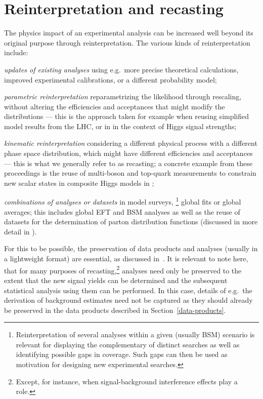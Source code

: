 \documentclass[11pt]{article}
\begin{document}
\section{Reinterpretation and recasting}
\label{reinterpret}

The physics impact of an experimental analysis can be increased well beyond its original purpose through \gls{reinterpretation}.
The various kinds of \gls{reinterpretation} include:
\begin{description}
	\item{\it updates of existing analyses} using e.g.\ more precise theoretical calculations, improved experimental calibrations, or a different probability model;
	\item{\it parametric reinterpretation} reparametrizing the likelihood through rescaling, without altering the efficiencies and acceptances that might modify the distributions --- this is the approach taken for example when reusing simplified model results from the LHC, or in in the context of Higgs signal strengths; 
    \item{\it kinematic reinterpretation} considering a different physical process with a different phase space distribution, which might have different efficiencies and acceptances --- this is what we generally refer to as \gls{recasting}; a concrete example from these proceedings is the reuse of multi-boson and top-quark measurements to constrain new scalar states in composite Higgs models in \cite{Banerjee:2022xmu}; 
    \item{\it combinations of analyses or datasets} in model surveys,%
    \footnote{Reinterpretation of several analyses within a given (usually \gls{BSM}) scenario is relevant for displaying the complementary of distinct searches as well as identifying possible gaps in coverage. Such gaps can then be used as motivation for designing new experimental searches.} 
    global fits or global averages; this includes global \gls{EFT} and \gls{BSM} analyses as well as the reuse of datasets for the determination of parton distribution functions (discussed in more detail in \cite{Cranmer:2021urp}).
\end{description}

For this to be possible, the preservation of \glspl{data product} and analyses (usually in a lightweight format) are essential, as discussed in~.
It is relevant to note here, that for many purposes of \gls{recasting},\footnote{Except, for instance, when signal-background interference effects play a role.} analyses need only be preserved to the extent that the new signal yields can be determined and the subsequent statistical analysis using them can be performed. In this case, details of e.g.\ the derivation of background estimates need not be captured as they should already be preserved in the \glspl{data product} described in Section~\ref{data-products}.
\end{document}
